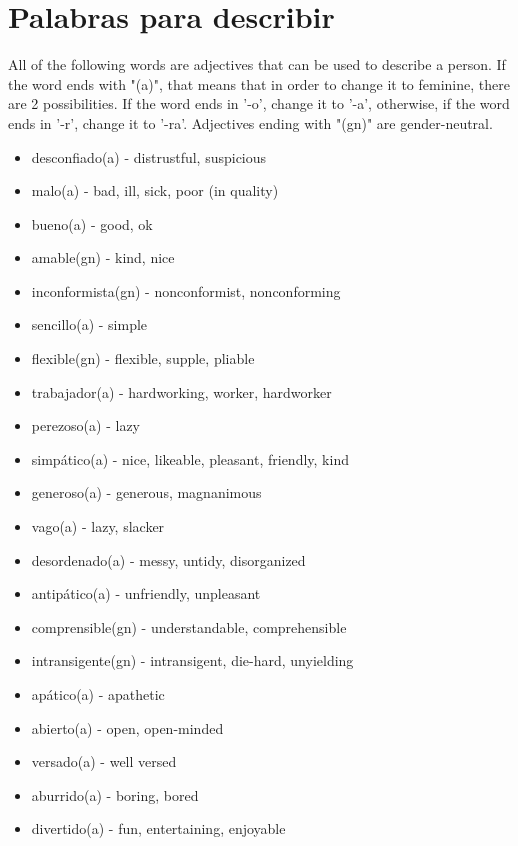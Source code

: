 \documentclass[12pt]{article}
\begin{document}
    \section{Palabras para describir}
        All of the following words are adjectives that can be used to describe a person. If the word ends
        with "(a)", that means that in order to change it to feminine, there are 2 possibilities. If the word
        ends in '-o', change it to '-a', otherwise, if the word ends in '-r', change it to '-ra'.
        Adjectives ending with "(gn)" are gender-neutral.
        \begin{itemize}
            \item desconfiado(a) - distrustful, suspicious
            \item malo(a) - bad, ill, sick, poor (in quality)
            \item bueno(a) - good, ok
            \item amable(gn) - kind, nice
            \item inconformista(gn) - nonconformist, nonconforming
            \item sencillo(a) - simple
            \item flexible(gn) - flexible, supple, pliable
            \item trabajador(a) - hardworking, worker, hardworker
            \item perezoso(a) - lazy
            \item simpático(a) - nice, likeable, pleasant, friendly, kind
            \item generoso(a) - generous, magnanimous
            \item vago(a) - lazy, slacker
            \item desordenado(a) - messy, untidy, disorganized
            \item antipático(a) - unfriendly, unpleasant
            \item comprensible(gn) - understandable, comprehensible
            \item intransigente(gn) - intransigent, die-hard, unyielding
            \item apático(a) - apathetic
            \item abierto(a) - open, open-minded
            \item versado(a) - well versed
            \item aburrido(a) - boring, bored
            \item divertido(a) - fun, entertaining, enjoyable

\end{itemize}
\end{document}
